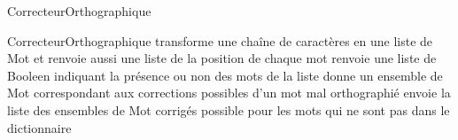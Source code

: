 \begin{tad}
	\begin{tadOperations}{CorrecteurOrthographique}
			{\tadUnParam{\chaine}}%
			{}
			{}%
			{}
			{}%
			{}
			{}%
			{}
	\end{tadOperations}
		
	\begin{tadSemantiques}{CorrecteurOrthographique}
			{transforme une cha\^ine de caract\`eres en une liste de Mot et renvoie aussi une liste de la position de chaque mot}
			{renvoie une liste de Booleen indiquant la présence ou non des mots de la liste}
			{donne un ensemble de Mot correspondant aux corrections possibles d’un mot mal orthographi\'e}
			{envoie la liste des ensembles de Mot corrig\'es possible pour les mots qui ne sont pas dans le dictionnaire}
	\end{tadSemantiques}
		
		
\end{tad}
